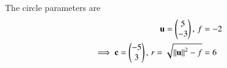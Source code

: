 The circle parameters are
\begin{align}
 \mathbf{u}=\begin{pmatrix}5\\ -3\end{pmatrix},\,
 f&=-2\\
\implies \mathbf{c}=\begin{pmatrix}-5 \\ 3\end{pmatrix},\,
	r=\sqrt{\left\lVert\mathbf{u}\right\rVert^2-f}
&= 6
\end{align}

